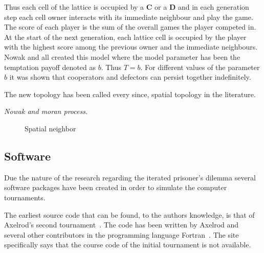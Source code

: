 \documentclass{article}
\begin{document}
Thus each cell of the lattice is occupied by a \textbf{C} or a \textbf{D} and in
each generation step each cell owner interacts with its immediate neighbour and
play the game. The score of each player is the sum of the overall games the player
competed in. At the start of the next generation, each lattice cell is occupied by the
player with the highest score among the previous owner and the immediate
neighbours. Nowak and all created this model  where the model parameter
has been the temptation payoff denoted as \(b\). Thus \(T=b\). For 
different values of the parameter \(b\) it was shown that cooperators and
defectors can persist together indefinitely. 

The new topology has been called every since, spatial topology in the 
literature. %

\textit{Nowak and moran process.} 

\begin{figure}[!hbtp]
\centering
    \begin{subfigure}{.25\textwidth}
            
    \end{subfigure}
    \begin{subfigure}{.25\textwidth}\centering
         
     \end{subfigure}
     \begin{subfigure}{.25\textwidth}\centering
         
     \end{subfigure}
     \caption{Spatial neighbor}
     \label{fig:topologies}
\end{figure}

\subsection{Software} 

Due the nature of the research regarding the iterated prisoner's dilemma
several software packages have been created in order to simulate the 
computer tournaments.

The earliest source code that can be found, to the authors knowledge, is that
of Axelrod's second tournament~\cite{axelrod1980b}.  The code has been 
written by Axelrod and several other contributors in the programming 
language Fortran~\cite{fortan_code}. The site specifically says that the course 
code of the initial tournament is not available. 
\end{document}
